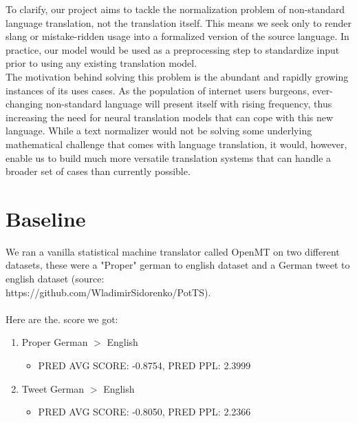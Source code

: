 \documentclass{article}
\begin{document}
To clarify, our project aims to tackle the normalization problem of non-standard language translation, not the translation itself. This means we seek only to render slang or mistake-ridden usage into a formalized version of the source language. In practice, our model would be used as a preprocessing step to standardize input prior to using any existing translation model.\\

The motivation behind solving this problem is the abundant and rapidly growing instances of its uses cases. As the population of internet users burgeons, ever-changing non-standard language will present itself with rising frequency, thus increasing the need for neural translation models that can cope with this new language. While a text normalizer would not be solving some underlying mathematical challenge that comes with language translation, it would, however, enable us to build much more versatile translation systems that can handle a broader set of cases than currently possible.   

\section{Baseline}

We ran a vanilla statistical machine translator called OpenMT on two different datasets, these were a "Proper" german to english dataset and a German tweet to english dataset (source: \\https://github.com/WladimirSidorenko/PotTS). \\\\Here are the. score we got:
\begin{enumerate}
	\item Proper German $>$ English
		\begin{itemize}
			\item PRED AVG SCORE: -0.8754, PRED PPL: 2.3999
		\end{itemize}
	\item Tweet German $>$ English
	\begin{itemize}
			\item PRED AVG SCORE: -0.8050, PRED PPL: 2.2366
		\end{itemize}
\end{enumerate}
\end{document}
